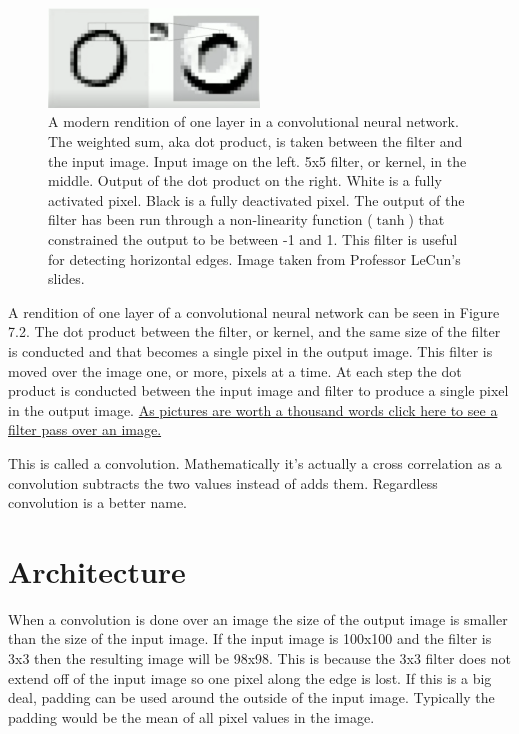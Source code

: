 \begin{figure}[ht]
  \centering    
      \includegraphics[width=0.5\textwidth]{lectures/03-b/images/ConvnetArch.png}
          \caption{
            A modern rendition of one layer in a convolutional neural network.
            The weighted sum, aka dot product, is taken between the filter and the input image.
            Input image on the left.
            5x5 filter, or kernel, in the middle.
            Output of the dot product on the right.
            White is a fully activated pixel.
            Black is a fully deactivated pixel.
            The output of the filter has been run through a non-linearity function ($\tanh$) that constrained the output to be between -1 and 1.
            This filter is useful for detecting horizontal edges.
            Image taken from Professor LeCun's slides.
          }
\end{figure}

A rendition of one layer of a convolutional neural network can be seen in Figure 7.2.
The dot product between the filter, or kernel, and the same size of the filter is conducted and that becomes a single pixel in the output image.
This filter is moved over the image one, or more, pixels at a time.
At each step the dot product is conducted between the input image and filter to produce a single pixel in the output image.
\href{https://cdn-images-1.medium.com/max/1600/1*ZCjPUFrB6eHPRi4eyP6aaA.gif}{As pictures are worth a thousand words click here to see a filter pass over an image.}

This is called a convolution.
Mathematically it's actually a cross correlation as a convolution subtracts the two values instead of adds them.
Regardless convolution is a better name.

\section{Architecture}

When a convolution is done over an image the size of the output image is smaller than the size of the input image.
If the input image is 100x100 and the filter is 3x3 then the resulting image will be 98x98.
This is because the 3x3 filter does not extend off of the input image so one pixel along the edge is lost.
If this is a big deal, padding can be used around the outside of the input image.
Typically the padding would be the mean of all pixel values in the image.

